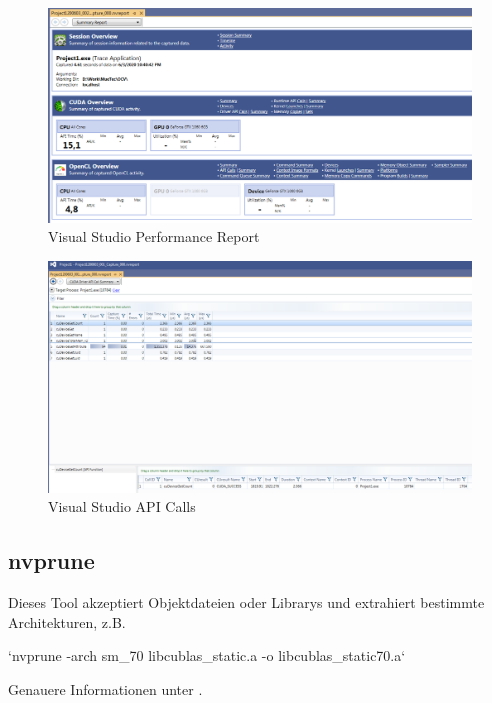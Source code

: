                     \begin{figure}[h]
			            \centering
			            \includegraphics[width=\textwidth]{chapter3/pictures/VSover.png}
			            \caption{Visual Studio Performance Report}
			            \label{fig3:vsover}
                    \end{figure}
                    \begin{figure}[h]
			            \centering
			            \includegraphics[width=\textwidth]{chapter3/pictures/VSapi.png}
			            \caption{Visual Studio API Calls}
			            \label{fig3:vsapi}
			        \end{figure}
			        \FloatBarrier
			        
			\subsection{nvprune}
			Dieses Tool akzeptiert Objektdateien oder Librarys und extrahiert bestimmte Architekturen, z.B.
			
			\li`nvprune -arch sm_70 libcublas_static.a -o libcublas_static70.a`
			
			Genauere Informationen unter \autocite{cudaBU}.
			
